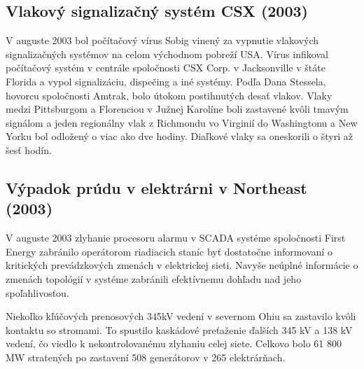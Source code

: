 \subsection{Vlakový signalizačný systém CSX (2003)}
\tab V auguste 2003 bol počítačový vírus Sobig vinený za vypnutie vlakových signalizačných systémov na celom východnom pobreží USA. Vírus infikoval počítačový systém v centrále spoločnosti CSX Corp. v Jacksonville v štáte Florida a vypol signalizáciu, dispečing a iné systémy. Podľa Dana Stessela, hovorcu spoločnosti Amtrak, bolo útokom postihnutých desať vlakov. Vlaky medzi Pittsburgom a Florenciou v Južnej Karolíne boli zastavené kvôli tmavým signálom a jeden regionálny vlak z Richmondu vo Virginií do Washingtonu a New Yorku bol odložený o viac ako dve hodiny. Diaľkové vlaky sa oneskorili o štyri až šesť hodín\cite[p.~3-20]{nist}.

\subsection{Výpadok prúdu v elektrárni v Northeast (2003)}
\tab V auguste 2003 zlyhanie procesoru alarmu v SCADA systéme spoločnosti First Energy zabránilo operátorom riadiacich staníc byť dostatočne informovaní o kritických prevádzkových zmenách v elektrickej sieti. Navyše neúplné informácie o zmenách topológií v systéme zabránili efektívnemu dohľadu nad jeho spoľahlivosťou. \par
Niekoľko kľúčových prenosových 345kV vedení v severnom Ohiu sa zastavilo kvôli kontaktu so stromami. To spustilo kaskádové preťaženie ďalších 345 kV a 138 kV vedení, čo viedlo k nekontrolovanému zlyhaniu celej siete. Celkovo bolo 61 800 MW stratených po zastavení 508 generátorov v 265 elektrárňach\cite[p.~3-20]{nist}.

